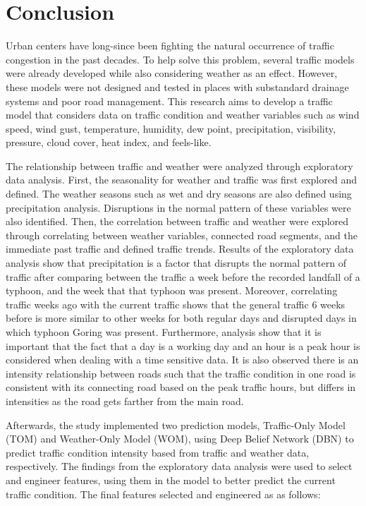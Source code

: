 \chapter{Conclusion}

Urban centers have long-since been fighting the natural occurrence of traffic congestion in the past decades. To help solve this problem, several traffic models were already developed while also considering weather as an effect. However, these models were not designed and tested in places with substandard drainage systems and poor road management. This research aims to develop a traffic model that considers data on traffic condition and weather variables such as wind speed, wind gust, temperature, humidity, dew point, precipitation, visibility, pressure, cloud cover, heat index, and feels-like.

The relationship between traffic and weather were analyzed through exploratory data analysis. First, the seasonality for weather and traffic was first explored and defined. The weather seasons such as wet and dry seasons are also defined using precipitation analysis. Disruptions in the normal pattern of these variables were also identified. Then, the correlation between traffic and weather were explored through correlating between weather variables, connected road segments, and the immediate past traffic and defined traffic trends. Results of the exploratory data analysis show that precipitation is a factor that disrupts the normal pattern of traffic after comparing between the traffic a week before the recorded landfall of a typhoon, and the week that that typhoon was present. Moreover, correlating traffic weeks ago with the current traffic shows that the general traffic 6 weeks before is more similar to other weeks for both regular days and disrupted days in which typhoon Goring was present. Furthermore, analysis show that it is important that the fact that a day is a working day and an hour is a peak hour is considered when dealing with a time sensitive data. It is also observed there is an intensity relationship between roads such that the traffic condition in one road is consistent with its connecting road based on the peak traffic hours, but differs in intensities as the road gets farther from the main road. 

Afterwards, the study implemented two prediction models, Traffic-Only Model (TOM) and Weather-Only Model (WOM), using Deep Belief Network (DBN) to predict traffic condition intensity based from traffic and weather data, respectively. The findings from the exploratory data analysis were used to select and engineer features, using them in the model to better predict the current traffic condition. The final features selected and engineered as as follows:

